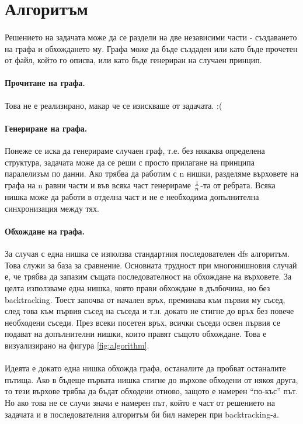 \section{Алгоритъм}

\paragraph*{} Решението на задачата може да се раздели на две независими части - създаването на графа и обхождането му. Графа може да бъде създаден или като бъде прочетен от файл, който го описва, или като бъде генериран на случаен принцип.

\paragraph*{Прочитане на графа.} Това не е реализирано, макар че се изискваше от задачата. :(

\paragraph*{Генериране на графа.} Понеже се иска да генерираме случаен граф, т.е. без някаква определена структура, задачата може да се реши с просто прилагане на принципа паралелизъм по данни. Ако трябва да работим с n нишки, разделяме върховете на графа на n равни части и във всяка част генерираме $ 1 \over n $-та от ребрата. Всяка нишка може да работи в отделна част и не е необходима допълнителна синхронизация между тях.

\paragraph*{Обхождане на графа.} За случая с една нишка се използва стандартния последователен dfs алгоритъм. Това служи за база за сравнение. Основната трудност при многонишновия случай е, че трябва да запазим същата последователност на обхождане на върховете. За целта използваме една нишка, която прави обхождане в дълбочина, но без backtracking. Тоест започва от начален връх, преминава към първия му съсед, след това към първия съсед на съседа и т.н. докато не стигне до връх без повече необходени съседи. През всеки посетен връх, всички съседи освен първия се подават на допълнителни нишки, които правят същото обхождане. Това е визуализирано на фигура \ref{fig:algorithm}.

\paragraph*{} Идеята е докато една нишка обхожда графа, останалите да пробват останалите пътища. Ако в бъдеще първата нишка стигне до върхове обходени от някоя друга, то тези върхове трябва да бъдат обходени отново, защото е намерен ``по-къс'' път. Но ако това не се случи значи е намерен път, който е част от решението на задачата и в последователния алгоритъм би бил намерен при backtracking-а.

